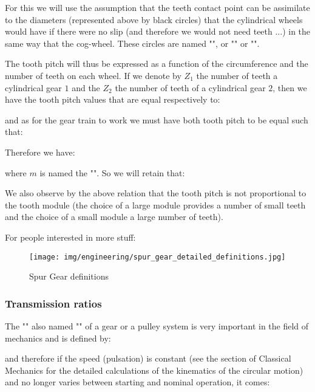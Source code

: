 	For this we will use the assumption that the teeth contact point can be assimilate to the diameters (represented above by black circles) that the cylindrical wheels would have if there were no slip (and therefore we would not need teeth ...) in the same way that the cog-wheel. These circles are named "", or "" or "".
	
	The tooth pitch will thus be expressed as a function of the circumference and the number of teeth on each wheel. If we denote by $Z_1$ the number of teeth a cylindrical gear $1$ and the $Z_2$ the number of teeth of a cylindrical gear $2$, then we have the tooth pitch values that are equal respectively to:
	
	and as for the gear train to work we must have both tooth pitch to be equal such that:
	
	Therefore we have:
	
	where $m$ is named the "". So we will retain that:
	
	We also observe by the above relation that the tooth pitch is not proportional to the tooth module (the choice of a large module provides a number of small teeth and the choice of a small module a large number of teeth).
	
	For people interested in more stuff:
	\begin{figure}[H]
		\begin{center}
			\texttt{[image: img/engineering/spur\_gear\_detailed\_definitions.jpg]}
		\end{center}	
		\caption{Spur Gear definitions}
	\end{figure}
	
	\subsubsection{Transmission ratios}
	The "" also named "" of a gear or a pulley system is very important in the field of mechanics and is defined by:
	
	and therefore if the speed (pulsation) is constant (see the section of Classical Mechanics for the detailed calculations of the kinematics of the circular motion) and no longer varies between starting and nominal operation, it comes:
	
